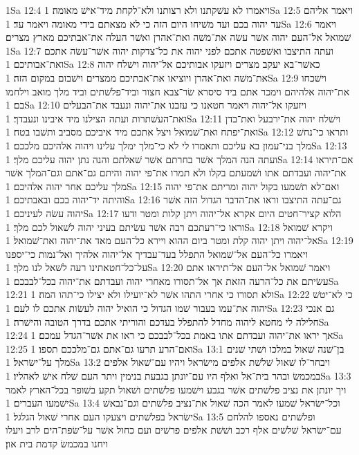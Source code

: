 1Sa 12:4  ויאמרו לא עשׁקתנו ולא רצותנו ולא־לקחת מיד־אישׁ מאומה׃
1Sa 12:5  ויאמר אליהם עד יהוה בכם ועד משׁיחו היום הזה כי לא מצאתם בידי מאומה ויאמר עד׃
1Sa 12:6  ויאמר שׁמואל אל־העם יהוה אשׁר עשׂה את־משׁה ואת־אהרן ואשׁר העלה את־אבתיכם מארץ מצרים׃
1Sa 12:7  ועתה התיצבו ואשׁפטה אתכם לפני יהוה את כל־צדקות יהוה אשׁר־עשׂה אתכם ואת־אבותיכם׃
1Sa 12:8  כאשׁר־בא יעקב מצרים ויזעקו אבותיכם אל־יהוה וישׁלח יהוה את־משׁה ואת־אהרן ויוציאו את־אבתיכם ממצרים וישׁבום במקום הזה׃
1Sa 12:9  וישׁכחו את־יהוה אלהיהם וימכר אתם ביד סיסרא שׂר־צבא חצור וביד־פלשׁתים וביד מלך מואב וילחמו בם׃
1Sa 12:10  ויזעקו אל־יהוה ויאמר חטאנו כי עזבנו את־יהוה ונעבד את־הבעלים ואת־העשׁתרות ועתה הצילנו מיד איבינו ונעבדך׃
1Sa 12:11  וישׁלח יהוה את־ירבעל ואת־בדן ואת־יפתח ואת־שׁמואל ויצל אתכם מיד איביכם מסביב ותשׁבו בטח׃
1Sa 12:12  ותראו כי־נחשׁ מלך בני־עמון בא עליכם ותאמרו לי לא כי־מלך ימלך עלינו ויהוה אלהיכם מלככם׃
1Sa 12:13  ועתה הנה המלך אשׁר בחרתם אשׁר שׁאלתם והנה נתן יהוה עליכם מלך׃
1Sa 12:14  אם־תיראו את־יהוה ועבדתם אתו ושׁמעתם בקלו ולא תמרו את־פי יהוה והיתם גם־אתם וגם־המלך אשׁר מלך עליכם אחר יהוה אלהיכם׃
1Sa 12:15  ואם־לא תשׁמעו בקול יהוה ומריתם את־פי יהוה והיתה יד־יהוה בכם ובאבתיכם׃
1Sa 12:16  גם־עתה התיצבו וראו את־הדבר הגדול הזה אשׁר יהוה עשׂה לעיניכם׃
1Sa 12:17  הלוא קציר־חטים היום אקרא אל־יהוה ויתן קלות ומטר ודעו וראו כי־רעתכם רבה אשׁר עשׂיתם בעיני יהוה לשׁאול לכם מלך׃
1Sa 12:18  ויקרא שׁמואל אל־יהוה ויתן יהוה קלת ומטר ביום ההוא ויירא כל־העם מאד את־יהוה ואת־שׁמואל׃
1Sa 12:19  ויאמרו כל־העם אל־שׁמואל התפלל בעד־עבדיך אל־יהוה אלהיך ואל־נמות כי־יספנו על־כל־חטאתינו רעה לשׁאל לנו מלך׃
1Sa 12:20  ויאמר שׁמואל אל־העם אל־תיראו אתם עשׂיתם את כל־הרעה הזאת אך אל־תסורו מאחרי יהוה ועבדתם את־יהוה בכל־לבבכם׃
1Sa 12:21  ולא תסורו כי אחרי התהו אשׁר לא־יועילו ולא יצילו כי־תהו המה׃
1Sa 12:22  כי לא־יטשׁ יהוה את־עמו בעבור שׁמו הגדול כי הואיל יהוה לעשׂות אתכם לו לעם׃
1Sa 12:23  גם אנכי חלילה לי מחטא ליהוה מחדל להתפלל בעדכם והוריתי אתכם בדרך הטובה והישׁרה׃
1Sa 12:24  אך יראו את־יהוה ועבדתם אתו באמת בכל־לבבכם כי ראו את אשׁר־הגדל עמכם׃
1Sa 12:25  ואם־הרע תרעו גם־אתם גם־מלככם תספו׃
1Sa 13:1  בן־שׁנה שׁאול במלכו ושׁתי שׁנים מלך על־ישׂראל׃
1Sa 13:2  ויבחר־לו שׁאול שׁלשׁת אלפים מישׂראל ויהיו עם־שׁאול אלפים במכמשׂ ובהר בית־אל ואלף היו עם־יונתן בגבעת בנימין ויתר העם שׁלח אישׁ לאהליו׃
1Sa 13:3  ויך יונתן את נציב פלשׁתים אשׁר בגבע וישׁמעו פלשׁתים ושׁאול תקע בשׁופר בכל־הארץ לאמר ישׁמעו העברים׃
1Sa 13:4  וכל־ישׂראל שׁמעו לאמר הכה שׁאול את־נציב פלשׁתים וגם־נבאשׁ ישׂראל בפלשׁתים ויצעקו העם אחרי שׁאול הגלגל׃
1Sa 13:5  ופלשׁתים נאספו להלחם עם־ישׂראל שׁלשׁים אלף רכב ושׁשׁת אלפים פרשׁים ועם כחול אשׁר על־שׂפת־הים לרב ויעלו ויחנו במכמשׂ קדמת בית און׃
